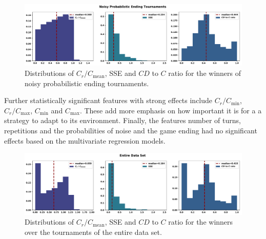 \begin{figure}[!htbp]
    \centering
        \centering
        \includegraphics[width=\textwidth]{../images/probend_noisy_discussion.pdf}
        \caption{Distributions of \(C_r / C_{\text{mean}}\), SSE and \(CD\) to \(C\) ratio
        for the winners of noisy probabilistic ending tournaments.}
        \label{fig:discussion_probend_noisy}
\end{figure}

Further statistically significant features with strong effects include \(C_r /
C_{\text{min}}\), \(C_r / C_{\text{max}}\), \(C_{\text{min}}\) and
\(C_{\text{max}}\). These add more emphasis on how important it is for a  a
strategy to adapt to its environment. Finally, the features number of turns,
repetitions and the probabilities of noise and the game ending had no
significant effects based on the multivariate regression models.

\begin{figure}[!htbp]
    \centering
        \centering
        \includegraphics[width=\textwidth]{../images/entire_data_discussion.pdf}
        \caption{Distributions of \(C_r / C_{\text{mean}}\), SSE and \(CD\) to \(C\) ratio
        for the winners over the tournaments of the entire data set.}
        \label{fig:discussion_entire_data}
\end{figure}